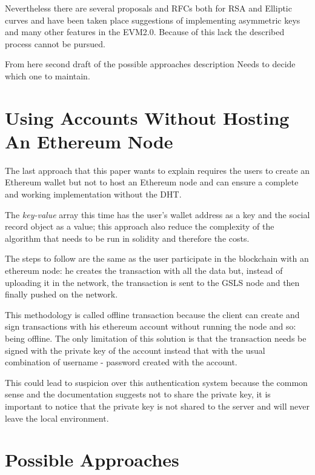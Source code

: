 Nevertheless there are several proposals and RFCs both for RSA and Elliptic curves \citep{ECImplementation} \citep{RSAImplementation} and have been taken place suggestions of implementing asymmetric keys and many other features in the EVM2.0.
Because of this lack the described process cannot be pursued.

\begin{notation}
	From here second draft of the possible approaches description
	Needs to decide which one to maintain.
\end{notation}

\section{Using Accounts Without Hosting An Ethereum Node}

The last approach that this paper wants to explain requires the users to create an Ethereum wallet but not to host an Ethereum node and can ensure a complete and working implementation without the DHT.

The \textit{key-value} array this time has the user's wallet address as a key and the social record object as a value; this approach also reduce the complexity of the algorithm that needs to be run in solidity and therefore the costs.

The steps to follow are the same as the user participate in the blockchain with an ethereum node: he creates the transaction with all the data but, instead of uploading it in the network, the transaction is sent to the GSLS node and then finally pushed on the network.

This methodology is called offline transaction because the client can create and sign transactions with his ethereum account without running the node and so: being offline. The only limitation of this solution is that the transaction needs be signed with the private key of the account instead that with the usual combination of username - password created with the account.

This could lead to suspicion over this authentication system because the common sense and the documentation suggests not to share the private key, it is important to notice that the private key is not shared to the server and will never leave the local environment.


\section{Possible Approaches}

